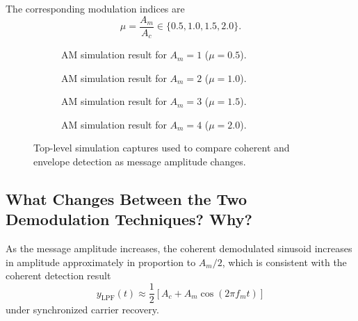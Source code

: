 The corresponding modulation indices are
\begin{equation}
\mu=\frac{A_m}{A_c}\in\{0.5,1.0,1.5,2.0\}.
\end{equation}

\begin{figure}[H]
\centering
\begin{subfigure}{0.49\linewidth}
\centering
{}
\caption{AM simulation result for $A_m = 1$ ($\mu = 0.5$).}
\label{fig:lab2_ex2_am1}
\end{subfigure}
\hfill
\begin{subfigure}{0.49\linewidth}
\centering
{}
\caption{AM simulation result for $A_m = 2$ ($\mu = 1.0$).}
\label{fig:lab2_ex2_am2}
\end{subfigure}

\vspace{0.5em}

\begin{subfigure}{0.49\linewidth}
\centering
{}
\caption{AM simulation result for $A_m = 3$ ($\mu = 1.5$).}
\label{fig:lab2_ex2_am3}
\end{subfigure}
\hfill
\begin{subfigure}{0.49\linewidth}
\centering
{}
\caption{AM simulation result for $A_m = 4$ ($\mu = 2.0$).}
\label{fig:lab2_ex2_am4}
\end{subfigure}
\caption{Top-level simulation captures used to compare coherent and envelope detection as message amplitude changes.}
\label{fig:lab2_ex2_all_cases}
\end{figure}

\subsection{What Changes Between the Two Demodulation Techniques? Why?}

As the message amplitude increases, the coherent demodulated sinusoid increases
in amplitude approximately in proportion to $A_m/2$, which is consistent with
the coherent detection result
\begin{equation}
y_{\mathrm{LPF}}(t)\approx \frac{1}{2}\left[A_c + A_m\cos(2\pi f_m t)\right]
\end{equation}
under synchronized carrier recovery.

